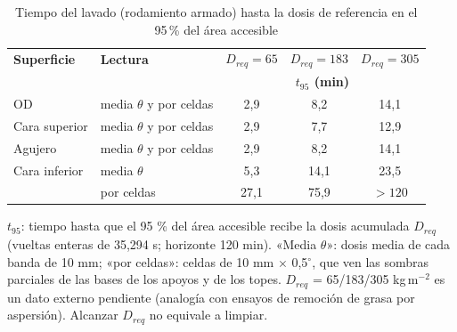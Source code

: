 \begin{table}[htbp]
\centering\small\singlespacing
\setlength{\tabcolsep}{4pt}
\caption{Tiempo del lavado (rodamiento armado) hasta la dosis de referencia en el 95\,\% del área accesible}
\label{tab:cfd-tiempo-lavado}
\begin{tabular}{@{}llccc@{}}
\toprule
\textbf{Superficie} & \textbf{Lectura} & \textbf{$D_{req}=65$} & \textbf{$D_{req}=183$} & \textbf{$D_{req}=305$}\\
& & \multicolumn{3}{c}{\textbf{$t_{95}$ (min)}}\\
\midrule
OD & media $\theta$ y por celdas & 2,9 & 8,2 & 14,1\\
Cara superior & media $\theta$ y por celdas & 2,9 & 7,7 & 12,9\\
Agujero & media $\theta$ y por celdas & 2,9 & 8,2 & 14,1\\
Cara inferior & media $\theta$ & 5,3 & 14,1 & 23,5\\
 & por celdas & 27,1 & 75,9 & $>120$\\
\bottomrule
\end{tabular}
\par\smallskip\footnotesize
$t_{95}$: tiempo hasta que el 95 \% del área accesible recibe la dosis acumulada $D_{req}$ (vueltas enteras de 35,294 s; horizonte 120 min). «Media $\theta$»: dosis media de cada banda de 10 mm; «por celdas»: celdas de 10 mm $\times$ 0,5$^\circ$, que ven las sombras parciales de las bases de los apoyos y de los topes. $D_{req}$ = 65/183/305 kg\,m$^{-2}$ es un dato externo pendiente (analogía con ensayos de remoción de grasa por aspersión). Alcanzar $D_{req}$ no equivale a limpiar.
\end{table}

